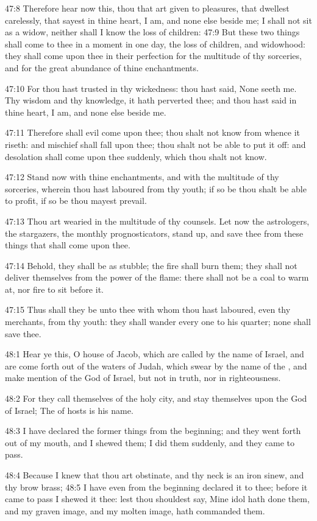47:8 Therefore hear now this, thou that art given to pleasures, that
dwellest carelessly, that sayest in thine heart, I am, and none else
beside me; I shall not sit as a widow, neither shall I know the loss
of children: 47:9 But these two things shall come to thee in a moment
in one day, the loss of children, and widowhood: they shall come upon
thee in their perfection for the multitude of thy sorceries, and for
the great abundance of thine enchantments.

47:10 For thou hast trusted in thy wickedness: thou hast said, None
seeth me. Thy wisdom and thy knowledge, it hath perverted thee; and
thou hast said in thine heart, I am, and none else beside me.

47:11 Therefore shall evil come upon thee; thou shalt not know from
whence it riseth: and mischief shall fall upon thee; thou shalt not be
able to put it off: and desolation shall come upon thee suddenly,
which thou shalt not know.

47:12 Stand now with thine enchantments, and with the multitude of thy
sorceries, wherein thou hast laboured from thy youth; if so be thou
shalt be able to profit, if so be thou mayest prevail.

47:13 Thou art wearied in the multitude of thy counsels. Let now the
astrologers, the stargazers, the monthly prognosticators, stand up,
and save thee from these things that shall come upon thee.

47:14 Behold, they shall be as stubble; the fire shall burn them; they
shall not deliver themselves from the power of the flame: there shall
not be a coal to warm at, nor fire to sit before it.

47:15 Thus shall they be unto thee with whom thou hast laboured, even
thy merchants, from thy youth: they shall wander every one to his
quarter; none shall save thee.

48:1 Hear ye this, O house of Jacob, which are called by the name of
Israel, and are come forth out of the waters of Judah, which swear by
the name of the \LORD, and make mention of the God of Israel, but not
in truth, nor in righteousness.

48:2 For they call themselves of the holy city, and stay themselves
upon the God of Israel; The \LORD of hosts is his name.

48:3 I have declared the former things from the beginning; and they
went forth out of my mouth, and I shewed them; I did them suddenly,
and they came to pass.

48:4 Because I knew that thou art obstinate, and thy neck is an iron
sinew, and thy brow brass; 48:5 I have even from the beginning
declared it to thee; before it came to pass I shewed it thee: lest
thou shouldest say, Mine idol hath done them, and my graven image, and
my molten image, hath commanded them.

